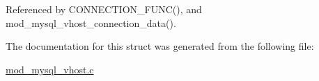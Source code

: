 Referenced by C\-O\-N\-N\-E\-C\-T\-I\-O\-N\-\_\-\-F\-U\-N\-C(), and mod\-\_\-mysql\-\_\-vhost\-\_\-connection\-\_\-data().



The documentation for this struct was generated from the following file\-:\begin{DoxyCompactItemize}
\item 
\hyperlink{mod__mysql__vhost_8c}{mod\-\_\-mysql\-\_\-vhost.\-c}\end{DoxyCompactItemize}
